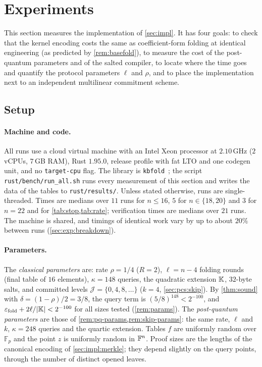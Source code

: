 \section{Experiments}\label{sec:exp}

This section measures the implementation of \cref{sec:impl}.
It has four goals: to check that the kernel encoding costs the same as coefficient-form folding at identical engineering (as predicted by \cref{rem:basefold}), to measure the cost of the post-quantum parameters and of the salted compiler, to locate where the time goes and quantify the protocol parameters $\ell$ and $\rho$, and to place the implementation next to an independent multilinear commitment scheme.

\subsection{Setup}\label{sec:exp:setup}

\paragraph{Machine and code.}
All runs use a cloud virtual machine with an Intel Xeon processor at $2.10$\,GHz ($2$ vCPUs, $7$\,GB RAM), Rust $1.95.0$, release profile with fat LTO and one codegen unit, and no \texttt{target-cpu} flag.
The library is \texttt{kbfold}~\kbversion; the script \texttt{rust/bench/run\_all.sh} runs every measurement of this section and writes the data of the tables to \texttt{rust/results/}.
Unless stated otherwise, runs are single-threaded.
Times are medians over $11$ runs for $n \le 16$, $5$ for $n \in \{18, 20\}$ and $3$ for $n = 22$ and for \cref{tab:stop,tab:rate}; verification times are medians over $21$ runs.
The machine is shared, and timings of identical work vary by up to about $20\%$ between runs (\cref{sec:exp:breakdown}).

\paragraph{Parameters.}
The \emph{classical parameters} are: rate $\rho = 1/4$ ($R = 2$), $\ell = n - 4$ folding rounds (final table of $16$ elements), $\kappa = 148$ queries, the quadratic extension $\mathbb{K}$, $32$-byte salts, and committed levels $\mathcal{J} = \{0, 4, 8, \dots\}$ ($k = 4$, \cref{sec:pcs:skip}).
By \cref{thm:sound} with $\delta = (1-\rho)/2 = 3/8$, the query term is $(5/8)^{148} < 2^{-100}$, and $\varepsilon_{\mathrm{fold}} + 2\ell/|\mathbb{K}| < 2^{-100}$ for all sizes tested (\cref{rem:params}).
The \emph{post-quantum parameters} are those of \cref{rem:pq-params,rem:skip-params}: the same rate, $\ell$ and $k$, $\kappa = 248$ queries and the quartic extension.
Tables $f$ are uniformly random over $\mathbb{F}_p$ and the point $z$ is uniformly random in $\mathbb{F}^n$.
Proof sizes are the lengths of the canonical encoding of \cref{sec:impl:merkle}; they depend slightly on the query points, through the number of distinct opened leaves.

